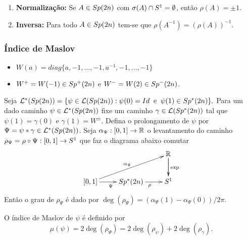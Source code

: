 \documentclass{beamer}
\begin{document}
\begin{footnotesize}
\begin{frame}
\begin{scriptsize}
\begin{enumerate}
			\item \textbf{Normalização:} Se $A \in Sp(2n)$ com $\sigma(A)\cap S^{1} = \emptyset$, então $\rho(A) = \pm 1$.
			
			
			\item  \textbf{Inversa:} Para todo $A \in Sp(2n)$ tem-se que $\rho(A^{-1})=(\rho(A))^{-1}$. 
			
			\end{enumerate}
		\end{scriptsize}
	\end{frame}
	
	\begin{frame}
		\frametitle{Índice de Maslov}
		\begin{scriptsize}
				
			\begin{itemize}
				\item $W(a) = diag\{a,-1,\dots,-1, a^{-1},-1,\dots,-1\}$
				
				\item $W^{+}=W(-1) \in  Sp^{+}(2n)$ e $W^{-} = W(2)\in Sp^{-}(2n)$.
				
			\end{itemize}
		\end{scriptsize}
		
	
	\begin{definicao}Seja 
		$
		\mathcal{L}^{*}(Sp(2n))=\{ \psi \in \mathcal{L}(Sp(2n)): \psi(0)=Id \;\; \text{e}\;\; \psi(1)\in Sp^{*}(2n)\}.
		$
		Para um dado caminho $\psi \in \mathcal{L}^{*}(Sp(2n))$ fixe um caminho $\gamma \in \mathcal{L}(Sp^{*}(2n))$ tal que $\psi(1)=\gamma(0)$ e $\gamma(1)=W^{\pm}$. Defina o prolongamento de $\psi$ por $\Psi = \psi*\gamma \in   \mathcal{L}^{*}(Sp(2n))$. Seja $\alpha_{\Psi}: [0,1] \to \mathbb{R}^{}$ o levantamento do caminho $\rho_{\Psi} = \rho \circ \Psi:[0,1]\to S^{1}$ que faz o diagrama abaixo comutar
		$$
		\xymatrix{
			& & \real{}\ar[d]\ar[d]^{\text{exp}}
			\\
			[0,1 ]\ar[urr]^{\alpha_{\Psi}} \ar[r]_{\Psi} & \gruposimpleticonaodegenerado{*} \ar[r]_{\rho} & S^{1}
		}
		$$	
		Então o grau de $\rho_{\Psi}$ é dado por $\deg(\rho_{\Psi}) = (\alpha_{\Psi}(1)-\alpha_{\Psi}(0))/2\pi$. 
		
		O índice de Maslov de $\psi$ é definido por
		$$
		\mu(\psi)= 2\deg(\rho_{\Psi}) = 2\deg(\rho_{\psi}) + 2\deg(\rho_{\gamma}).
		$$
		
		
	\end{definicao}
	

\end{frame}
\end{footnotesize}
\end{document}
